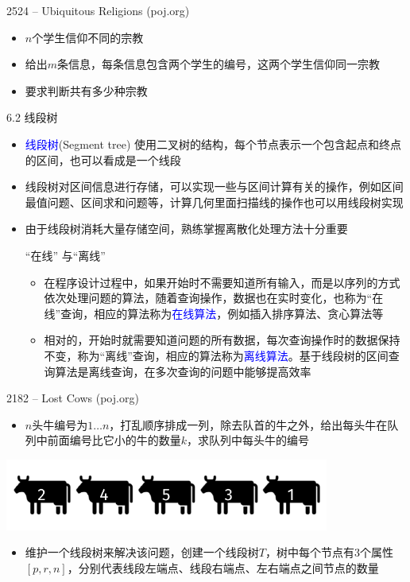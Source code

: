 \begin{frame}{2524 -- Ubiquitous Religions (poj.org)}
    \begin{itemize}
        \item $n$个学生信仰不同的宗教
        \vfill
        \item 给出$m$条信息，每条信息包含两个学生的编号，这两个学生信仰同一宗教
        \vfill
        \item 要求判断共有多少种宗教
    \end{itemize}
\end{frame}
\begin{frame}{6.2 线段树}
    \begin{itemize}
        \item \textcolor{blue}{线段树}(Segment tree) 使用二叉树的结构，每个节点表示一个包含起点和终点的区间，也可以看成是一个线段
        \item 线段树对区间信息进行存储，可以实现一些与区间计算有关的操作，例如区间最值问题、区间求和问题等，计算几何里面扫描线的操作也可以用线段树实现
        \item 由于线段树消耗大量存储空间，熟练掌握离散化处理方法十分重要
        \begin{block}{“在线” 与“离线”}
            \small{
                \begin{itemize}
                    \item 在程序设计过程中，如果开始时不需要知道所有输入，而是以序列的方式依次处理问题的算法，随着查询操作，数据也在实时变化，也称为“在线”查询，相应的算法称为\textcolor{blue}{在线算法}，例如插入排序算法、贪心算法等
                    \item 相对的，开始时就需要知道问题的所有数据，每次查询操作时的数据保持不变，称为“离线”查询，相应的算法称为\textcolor{blue}{离线算法}。基于线段树的区间查询算法是离线查询，在多次查询的问题中能够提高效率
                \end{itemize}}
        \end{block}
    \end{itemize}
\end{frame}
\begin{frame}{2182 -- Lost Cows (poj.org)}
    \begin{itemize}
        \item  $n$头牛编号为$1…n$，打乱顺序排成一列，除去队首的牛之外，给出每头牛在队列中前面编号比它小的牛的数量$k$，求队列中每头牛的编号
    \end{itemize}
    \includegraphics[width=0.8\textwidth,center]{fig/6-11.pdf}
    \begin{itemize}
        \item  维护一个线段树来解决该问题，创建一个线段树$T$，树中每个节点有3个属性$[p,r,n]$，分别代表线段左端点、线段右端点、左右端点之间节点的数量
    \end{itemize}
\end{frame}
